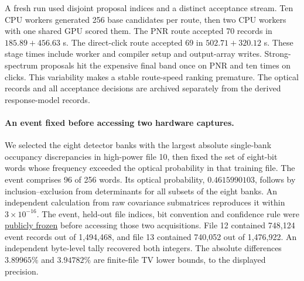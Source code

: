 \documentclass[11pt]{article}
\begin{document}
A fresh run used disjoint proposal indices and a distinct acceptance stream. Ten CPU workers generated 256 base candidates per route, then two CPU workers with one shared GPU scored them. The PNR route accepted 70 records in $185.89+456.63$ s. The direct-click route accepted 69 in $502.71+320.12$ s. These stage times include worker and compiler setup and output-array writes. Strong-spectrum proposals hit the expensive final band once on PNR and ten times on clicks. This variability makes a stable route-speed ranking premature. The optical records and all acceptance decisions are archived separately from the derived response-model records.

\paragraph{An event fixed before accessing two hardware captures.}
We selected the eight detector banks with the largest absolute single-bank occupancy discrepancies in high-power file 10, then fixed the set of eight-bit words whose frequency exceeded the optical probability in that training file. The event comprises 96 of 256 words. Its optical probability, $0.4615990103$, follows by inclusion--exclusion from determinants for all subsets of the eight banks. An independent calculation from raw covariance submatrices reproduces it within $3\times10^{-16}$. The event, held-out file indices, bit convention and confidence rule were \href{https://github.com/qiyuanhuakai/deziroGBS/tree/bfd6320687e6a193fe4d7194c81f79e3d4688d3d/results/iteration119_weights}{publicly frozen} before accessing those two acquisitions. File 12 contained 748,124 event records out of 1,494,468, and file 13 contained 740,052 out of 1,476,922. An independent byte-level tally recovered both integers. The absolute differences $3.89965\%$ and $3.94782\%$ are finite-file TV lower bounds, to the displayed precision.
\end{document}
